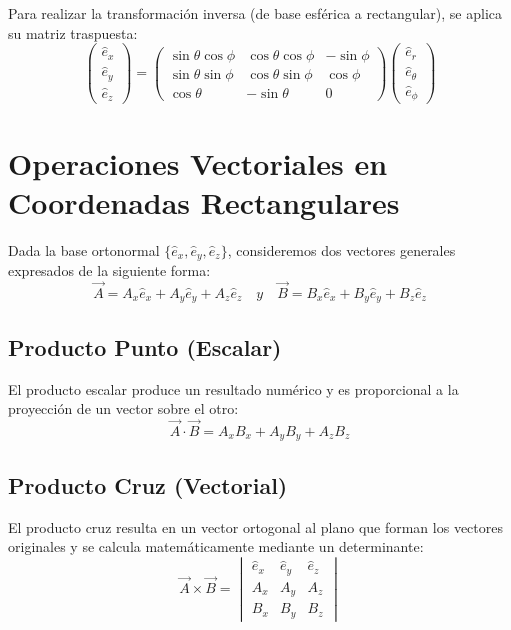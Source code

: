 \documentclass[11pt, a4paper]{article}
\begin{document}
Para realizar la transformación inversa (de base esférica a rectangular), se aplica su matriz traspuesta:
\begin{equation*}
    \begin{pmatrix} \hat{e}_x \\ \hat{e}_y \\ \hat{e}_z \end{pmatrix} = 
    \begin{pmatrix} 
        \sin\theta\cos\phi & \cos\theta\cos\phi & -\sin\phi \\ 
        \sin\theta\sin\phi & \cos\theta\sin\phi & \cos\phi \\ 
        \cos\theta & -\sin\theta & 0 
    \end{pmatrix}
    \begin{pmatrix} \hat{e}_r \\ \hat{e}_\theta \\ \hat{e}_\phi \end{pmatrix}
\end{equation*}

\vspace{0.5cm}

\section{Operaciones Vectoriales en Coordenadas Rectangulares}

Dada la base ortonormal $\{\hat{e}_x, \hat{e}_y, \hat{e}_z\}$, consideremos dos vectores generales expresados de la siguiente forma:
$$\vec{A} = A_x\hat{e}_x + A_y\hat{e}_y + A_z\hat{e}_z \quad y \quad \vec{B} = B_x\hat{e}_x + B_y\hat{e}_y + B_z\hat{e}_z$$

\subsection{Producto Punto (Escalar)}
El producto escalar produce un resultado numérico y es proporcional a la proyección de un vector sobre el otro:
$$\boxed{\vec{A} \cdot \vec{B} = A_xB_x + A_yB_y + A_zB_z}$$

\subsection{Producto Cruz (Vectorial)}
El producto cruz resulta en un vector ortogonal al plano que forman los vectores originales y se calcula matemáticamente mediante un determinante:
$$\vec{A} \times \vec{B} = \begin{vmatrix} \hat{e}_x & \hat{e}_y & \hat{e}_z \\ A_x & A_y & A_z \\ B_x & B_y & B_z \end{vmatrix}$$
\end{document}

